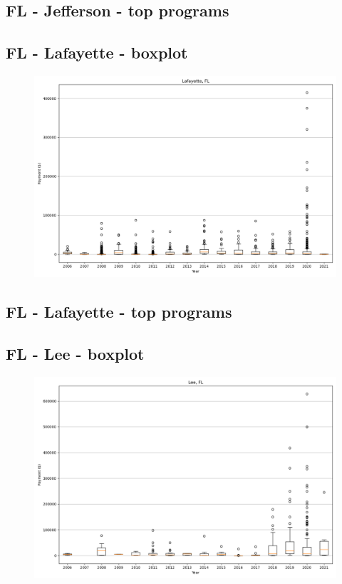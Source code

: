 \subsection*{FL - Jefferson - top programs}

\newpage
\subsection*{FL - Lafayette - boxplot}
\begin{figure}[h]
\centering
\includegraphics[width=7in]{../output/boxplots/counties/Lafayette-FL_boxplot.png}
\end{figure}


\subsection*{FL - Lafayette - top programs}

\newpage
\subsection*{FL - Lee - boxplot}
\begin{figure}[h]
\centering
\includegraphics[width=7in]{../output/boxplots/counties/Lee-FL_boxplot.png}
\end{figure}


